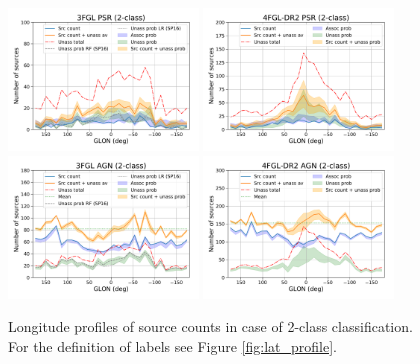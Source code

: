 \begin{figure}[h]
\center
\includegraphics[width=0.45\textwidth]{plots/lon_profile_PSR_3FGL_2classes.pdf}
\includegraphics[width=0.45\textwidth]{plots/lon_profile_PSR_4FGL-DR2_2classes.pdf} \\
\includegraphics[width=0.45\textwidth]{plots/lon_profile_AGN_3FGL_2classes.pdf}
\includegraphics[width=0.45\textwidth]{plots/lon_profile_AGN_4FGL-DR2_2classes.pdf}
\caption{Longitude profiles of source counts in case of 2-class classification. For the definition of labels see Figure \ref{fig:lat_profile}.}  
\label{fig:lon_profile}
\end{figure}



